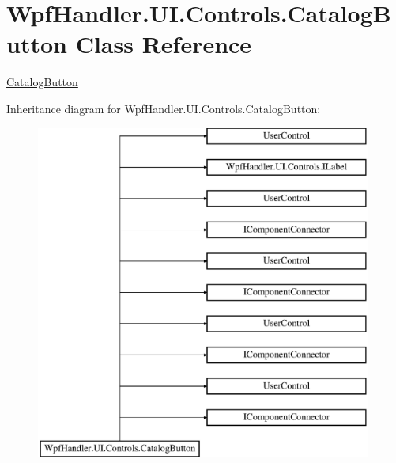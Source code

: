 \hypertarget{class_wpf_handler_1_1_u_i_1_1_controls_1_1_catalog_button}{}\section{Wpf\+Handler.\+U\+I.\+Controls.\+Catalog\+Button Class Reference}
\label{class_wpf_handler_1_1_u_i_1_1_controls_1_1_catalog_button}


\mbox{\hyperlink{class_wpf_handler_1_1_u_i_1_1_controls_1_1_catalog_button}{Catalog\+Button}}  


Inheritance diagram for Wpf\+Handler.\+U\+I.\+Controls.\+Catalog\+Button\+:\begin{figure}[H]
\begin{center}
\leavevmode
\includegraphics[height=11.000000cm]{d0/d24/class_wpf_handler_1_1_u_i_1_1_controls_1_1_catalog_button}
\end{center}
\end{figure}
